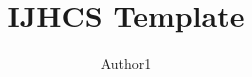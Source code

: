 \documentclass[3p,times,twocolumn]{elsarticle}
\begin{document}
\begin{frontmatter}



\title{IJHCS Template}


\author[1]{Author1} %


\begin{abstract}

\end{abstract}
%

\begin{keyword}

\end{keyword}

\end{frontmatter}

\end{document}
